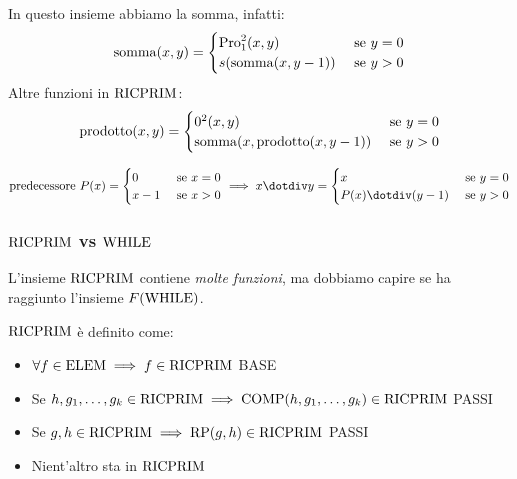 In questo insieme abbiamo la somma, infatti: 
$$
\operatorname{somma}(x,y) = \begin{cases}
	\text{Pro}_1^2 (x,y) & \text{ se } y = 0 \\
	s (\operatorname{somma}(x, y-1)) & \text{ se } y > 0 \\
\end{cases}
$$
Altre funzioni in $\text{RICPRIM}$:
$$ 
\operatorname{prodotto} (x,y) = \begin{cases}
	0^2 (x,y) & \text{ se } y = 0 \\
	\operatorname{somma}(x, \operatorname{prodotto}(x, y-1)) & \text{ se } y > 0 \\
\end{cases}
$$

$$
\predecessore \, P(x) = \begin{cases}
	0 & \text{ se } x = 0 \\
	x-1 & \text{ se } x > 0
\end{cases}
\implies 
x \dotminus y = \begin{cases}
	x & \text{ se } y = 0 \\
	P(x) \dotminus (y-1) & \text{ se $y > 0$}
\end{cases}
$$

\subsubsection{$\text{RICPRIM}$ vs $\text{WHILE}$}

L'insieme $\text{RICPRIM}$ contiene \textit{molte funzioni}, ma dobbiamo capire se ha raggiunto l'insieme $F(\text{WHILE})$.

$\text{RICPRIM}$ è definito come: 
\begin{itemize}
	\item $\forall f \in \text{ELEM} \implies f \in \text{RICPRIM}$ \hfill BASE
	
    \item Se $h, g_1, \dots, g_k \in \text{RICPRIM} \implies \text{COMP}(h, g_1, \dots, g_k) \in \text{RICPRIM}$ \hfill PASSI
	
    \item Se $g,h \in \text{RICPRIM} \implies \text{RP} (g,h) \in \text{RICPRIM}$ \hfill PASSI
	
    \item Nient'altro sta in $\text{RICPRIM}$ \\
\end{itemize}


